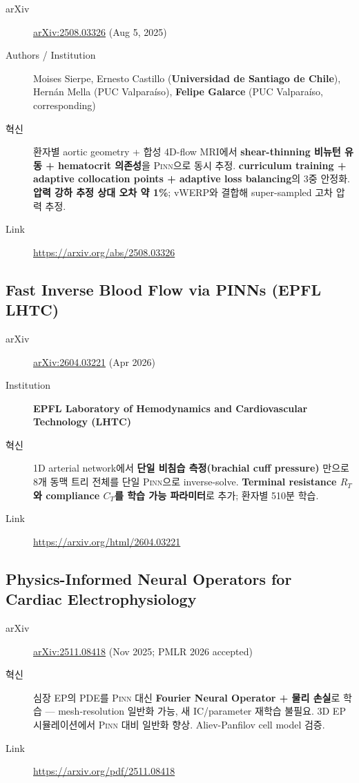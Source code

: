 \documentclass[11pt,a4paper,oneside]{report}
\newcommand{\pinn}{\textsc{Pinn}}
\newcommand{\arxivid}[1]{\href{https://arxiv.org/abs/#1}{arXiv:#1}}
\begin{document}
\begin{description}
\item[arXiv] \arxivid{2508.03326} (Aug 5, 2025)
\item[Authors / Institution] Moises Sierpe, Ernesto Castillo (\textbf{Universidad de Santiago de Chile}), Hernán Mella (PUC Valparaíso), \textbf{Felipe Galarce} (PUC Valparaíso, corresponding)
\item[혁신] 환자별 aortic geometry + 합성 4D-flow MRI에서 \textbf{shear-thinning 비뉴턴 유동 + hematocrit 의존성}을 \pinn{}으로 동시 추정. \textbf{curriculum training + adaptive collocation points + adaptive loss balancing}의 3중 안정화. \textbf{압력 강하 추정 상대 오차 약 1\%}; vWERP와 결합해 super-sampled 고차 압력 추정.
\item[Link] \url{https://arxiv.org/abs/2508.03326}
\end{description}

\subsection{Fast Inverse Blood Flow via PINNs (EPFL LHTC)}

\begin{description}
\item[arXiv] \arxivid{2604.03221} (Apr 2026)
\item[Institution] \textbf{EPFL Laboratory of Hemodynamics and Cardiovascular Technology (LHTC)}
\item[혁신] 1D arterial network에서 \textbf{단일 비침습 측정(brachial cuff pressure)} 만으로 8개 동맥 트리 전체를 단일 \pinn{}으로 inverse-solve. \textbf{Terminal resistance $R_T$와 compliance $C_T$를 학습 가능 파라미터}로 추가; 환자별 5\textendash 10분 학습.
\item[Link] \url{https://arxiv.org/html/2604.03221}
\end{description}

\subsection{Physics-Informed Neural Operators for Cardiac Electrophysiology}

\begin{description}
\item[arXiv] \arxivid{2511.08418} (Nov 2025; PMLR 2026 accepted)
\item[혁신] 심장 EP의 PDE를 \pinn{} 대신 \textbf{Fourier Neural Operator + 물리 손실}로 학습 --- mesh-resolution 일반화 가능, 새 IC/parameter 재학습 불필요. 3D EP 시뮬레이션에서 \pinn{} 대비 일반화 향상. Aliev-Panfilov cell model 검증.
\item[Link] \url{https://arxiv.org/pdf/2511.08418}
\end{description}
\end{document}
